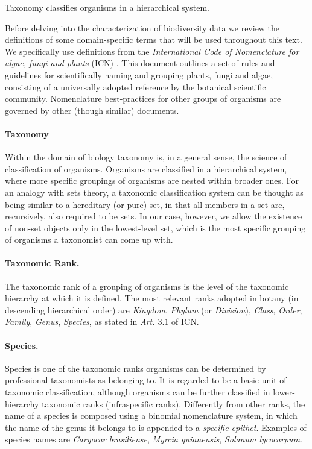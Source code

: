 Taxonomy classifies organisms in a hierarchical system.

Before delving into the characterization of biodiversity data we review the definitions of some domain-specific terms that will be used throughout this text. 
We specifically use definitions from the \textit{International Code of Nomenclature for algae, fungi and plants} (ICN) \cite{McNeill2012}. This document outlines a set of rules and guidelines for scientifically naming and grouping plants, fungi and algae, consisting of a universally adopted reference by the botanical scientific community. Nomenclature best-practices for other groups of organisms are governed by other (though similar) documents.

\paragraph*{Taxonomy}
Within the domain of biology taxonomy is, in a general sense, the science of classification of organisms. 
Organisms are classified in a hierarchical system, where more specific groupings of organisms are nested within broader ones. 
For an analogy with sets theory, a taxonomic classification system can be thought as being similar to a hereditary (or pure) set, in that all members in a set are, recursively, also required to be sets. In our case, however, we allow the existence of non-set objects only in the lowest-level set, which is the most specific grouping of organisms a taxonomist can come up with.

\paragraph*{Taxonomic Rank.}
The taxonomic rank of a grouping of organisms is the level of the taxonomic hierarchy at which it is defined. The most relevant ranks adopted in botany (in descending hierarchical order) are \textit{Kingdom}, \textit{Phylum} (or \textit{Division}), \textit{Class}, \textit{Order}, \textit{Family}, \textit{Genus}, \textit{Species}, as stated in \textit{Art. $3.1$} of ICN.

\paragraph*{Species.}
Species is one of the taxonomic ranks organisms can be determined by professional taxonomists as belonging to. It is regarded to be a basic unit of taxonomic classification, although organisms can be further classified in lower-hierarchy taxonomic ranks (infraspecific ranks).
Differently from other ranks, the name of a species is composed using a binomial nomenclature system, in which the name of the genus it belongs to is appended to a \textit{specific epithet}.
Examples of species names are \textit{Caryocar brasiliense}, \textit{Myrcia guianensis}, \textit{Solanum lycocarpum}.

